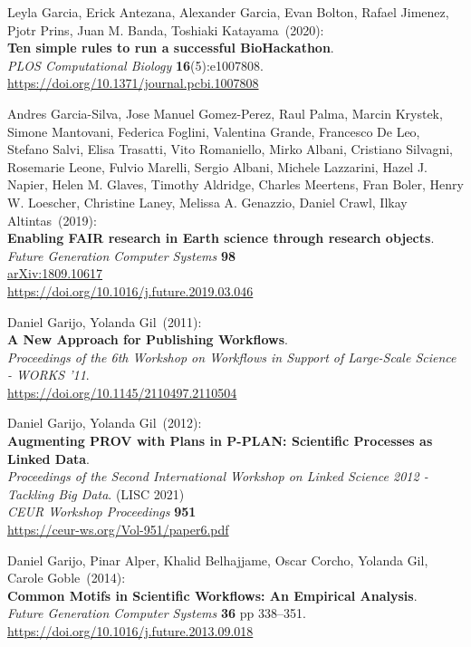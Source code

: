 \begin{thebibliography}{9}
Leyla Garcia, Erick Antezana, Alexander Garcia, Evan Bolton,
Rafael Jimenez, Pjotr Prins, Juan M. Banda, Toshiaki Katayama~(2020): \\
\textbf{Ten simple rules to run a successful BioHackathon}. \\
\emph{PLOS Computational Biology} \textbf{16}(5):e1007808.\\
\url{https://doi.org/10.1371/journal.pcbi.1007808}

Andres Garcia-Silva, Jose Manuel Gomez-Perez, Raul Palma,
Marcin Krystek, Simone Mantovani, Federica Foglini, Valentina Grande,
Francesco De Leo, Stefano Salvi, Elisa Trasatti, Vito Romaniello, Mirko
Albani, Cristiano Silvagni, Rosemarie Leone, Fulvio Marelli, Sergio
Albani, Michele Lazzarini, Hazel J. Napier, Helen M. Glaves, Timothy
Aldridge, Charles Meertens, Fran Boler, Henry W. Loescher, Christine
Laney, Melissa A. Genazzio, Daniel Crawl, Ilkay Altintas~(2019): \\
\textbf{Enabling FAIR research in Earth science through research
objects}.\\
\emph{Future Generation Computer Systems} \textbf{98} \\
\href{https://doi.org/10.48550/arXiv.1809.10617}{arXiv:1809.10617} \\
\url{https://doi.org/10.1016/j.future.2019.03.046}

Daniel Garijo, Yolanda Gil~(2011): \\
\textbf{A New Approach for Publishing Workflows}.\\
\emph{Proceedings of the 6th Workshop on Workflows in Support of Large-Scale Science - WORKS '11}.\\
\url{https://doi.org/10.1145/2110497.2110504}

 Daniel Garijo, Yolanda Gil~(2012): \\
\textbf{Augmenting PROV with Plans in P-PLAN: Scientific Processes as Linked Data}.\\
\emph{Proceedings of the Second International Workshop on Linked Science 2012 - Tackling Big Data}. (LISC 2021)\\
\emph{CEUR Workshop Proceedings} \textbf{951}\\
\url{https://ceur-ws.org/Vol-951/paper6.pdf}

Daniel Garijo, Pinar Alper, Khalid Belhajjame, Oscar Corcho,
Yolanda Gil, Carole Goble~(2014): \\
\textbf{Common Motifs in Scientific Workflows: An Empirical Analysis}.\\
\emph{Future Generation Computer Systems} \textbf{36} pp 338--351.\\
\url{https://doi.org/10.1016/j.future.2013.09.018}


\end{thebibliography}

